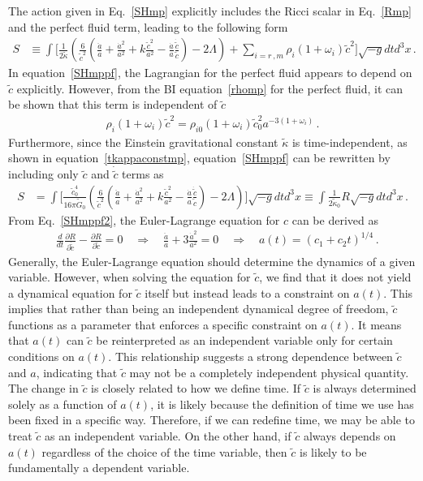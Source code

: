 \documentclass[jkps,preprint,fleqn]{revtex4} %
\newcommand{\tc}{\tilde{c}}
\newcommand{\tG}{\tilde{G}}
\newcommand{\tkapp}{\tilde{\kappa}}
\begin{document}
The action given in Eq.~\eqref{SHmp} explicitly includes the Ricci scalar in Eq.~\eqref{Rmp} and the perfect fluid term, leading to the following form
\begin{align}
S &\equiv \int \Biggl[ \frac{1}{2 \tkapp} \left( \frac{6}{\tc^2} \left( \frac{\ddot{a}}{a} + \frac{\dot{a}^2}{a^2} + k \frac{\tc^2}{a^2} - \frac{\dot{a}}{a} \frac{\dot{\tc}}{ \tc} \right)  - 2 \Lambda \right) + \sum_{i=r\,,m} \rho_i (1 + \omega_i ) \tc^2 \Biggr] \sqrt{-g} dt d^3x \label{SHmppf} \,. 
\end{align}
In equation~\eqref{SHmppf}, the Lagrangian for the perfect fluid appears to depend on $\tc$ explicitly. However, from the BI equation~\eqref{rhomp} for the perfect fluid, it can be shown that this term is independent of $\tc$
\begin{align}
 \rho_i (1 + \omega_i ) \tc^2 =  \rho_{i0} (1 + \omega_i ) \tc_{0}^2 a^{-3(1 + \omega_i )}  \label{rhoi} \,.
\end{align}
Furthermore, since the Einstein gravitational constant $\tkapp$ is time-independent, as shown in equation~\eqref{tkappaconstmp}, equation~\eqref{SHmppf} can be rewritten by including only $\tc$ and $\dot{\tc}$ terms as 
\begin{align}
S &= \int \Biggl[ \frac{\tc_0^4}{16 \pi \tG_0} \left( \frac{6}{\tc^2} \left( \frac{\ddot{a}}{a} + \frac{\dot{a}^2}{a^2} + k \frac{\tc^2}{a^2} - \frac{\dot{a}}{a} \frac{\dot{\tc}}{ \tc} \right)  - 2 \Lambda \right)  \Biggr] \sqrt{-g} dt d^3x \equiv \int \frac{1}{2 \tkapp_0} R \sqrt{-g} dt d^3x \label{SHmppf2} \,.
\end{align}
From Eq.~\eqref{SHmppf2}, the Euler-Lagrange equation for \( c \) can be derived as 
\begin{align}
& \frac{d}{dt} \frac{\partial R}{\partial \dot{\tc}} - \frac{\partial R}{\partial \tc} = 0 \quad \Rightarrow \quad \frac{\ddot{a}}{a} + 3 \frac{\dot{a}^2}{a^2} = 0 \quad \Rightarrow \quad a(t) = (c_1 + c_2 t)^{1/4} \label{eomtc} \,.
\end{align}
Generally, the Euler-Lagrange equation should determine the dynamics of a given variable. However, when solving the equation for $\tc$, we find that it does not yield a dynamical equation for $\tc$ itself but instead leads to a constraint on $a(t)$. This implies that rather than being an independent dynamical degree of freedom, $\tc$ functions as a parameter that enforces a specific constraint on $a(t)$.
It means that $a(t)$ can $\tc$ be reinterpreted as an independent variable only for certain conditions on $a(t)$. This relationship suggests a strong dependence between $\tc$ and $a$, indicating that $\tc$ may not be a completely independent physical quantity. The change in $\tc$ is closely related to how we define time. If $\tc$ is always determined solely as a function of $a(t)$, it is likely because the definition of time we use has been fixed in a specific way. Therefore, if we can redefine time, we may be able to treat $\tc$ as an independent variable. On the other hand, if $\tc$ always depends on $a(t)$ regardless of the choice of the time variable, then $\tc$ is likely to be fundamentally a dependent variable.
\end{document}
